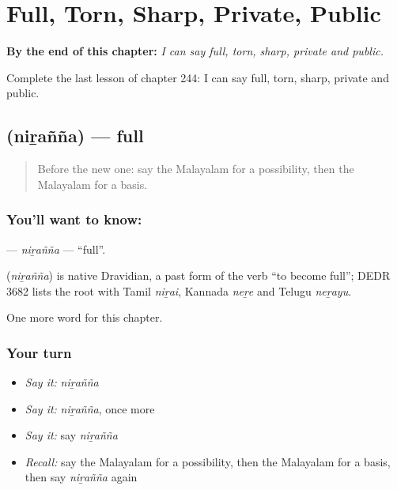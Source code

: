 
\chapter{Full, Torn, Sharp, Private, Public}
\label{ch:ml-full-torn-sharp-private-public}

\begin{chapteropening}
\textbf{By the end of this chapter:} \emph{I can say full, torn, sharp, private and public.}

Complete the last lesson of chapter 244: I can say full, torn, sharp, private and public.
\end{chapteropening}

\section[\texorpdfstring{\ml{നിറഞ്ഞ} (niṟañña)}{നിറഞ്ഞ (niṟañña)}]{ (niṟañña) — full}

\label{lesson:ML-C244-niranna}



\begin{quote}
Before the new one: say the Malayalam for a possibility, then the Malayalam for a basis.
\end{quote}

\subsection*{You'll want to know: }
\textbf{} — \emph{niṟañña} — \textquotedblleft{}full\textquotedblright{}.

\begin{cousinweb}
\textbf{} (\emph{niṟañña}) is native Dravidian, a past form of the verb \textquotedblleft{}to become full\textquotedblright{}; DEDR 3682 lists the root with Tamil \emph{niṟai}, Kannada \emph{neṟe} and Telugu \emph{neṟayu}.
\end{cousinweb}

\begin{grammarlens}[title={What you've built}]
One more word for this chapter.
\end{grammarlens}

\subsection*{Your turn}
\begin{itemize}
\raggedright
  \item \emph{Say it:} \emph{niṟañña}
  \item \emph{Say it:} \emph{niṟañña}, once more
  \item \emph{Say it:} say \emph{niṟañña}
  \item \emph{Recall:} say the Malayalam for a possibility, then the Malayalam for a basis, then say \emph{niṟañña} again
\end{itemize}

